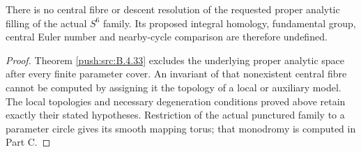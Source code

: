 \begin{corollary}\label{push:src:B.5.1}\label{push:B51}
There is no central fibre or descent resolution
of the requested proper analytic filling of the
actual $S^6$ family. Its proposed integral homology,
fundamental group, central Euler number and
nearby-cycle comparison are therefore undefined.
\end{corollary}

\begin{proof}
Theorem \ref{push:src:B.4.33} excludes the underlying proper
analytic space after every finite parameter cover.
An invariant of that nonexistent central fibre
cannot be computed by assigning it the topology
of a local or auxiliary model. The local topologies
and necessary degeneration conditions proved above
retain exactly their stated hypotheses. Restriction of the actual punctured family to a parameter circle
gives its smooth mapping torus; that monodromy is computed in Part C.
\end{proof}